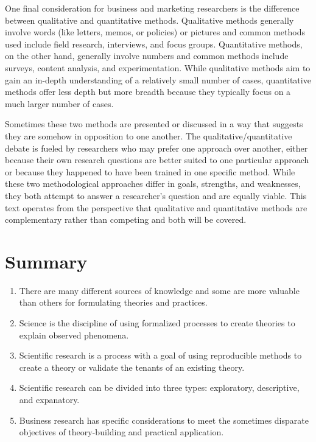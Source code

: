 \documentclass[]{book}
\theoremstyle{definition}
\theoremstyle{definition}
\theoremstyle{definition}
\theoremstyle{remark}
\begin{document}
One final consideration for business and marketing researchers is the
difference between qualitative and quantitative methods. Qualitative
methods generally involve words (like letters, memos, or policies) or
pictures and common methods used include field research, interviews, and
focus groups. Quantitative methods, on the other hand, generally involve
numbers and common methods include surveys, content analysis, and
experimentation. While qualitative methods aim to gain an in-depth
understanding of a relatively small number of cases, quantitative
methods offer less depth but more breadth because they typically focus
on a much larger number of cases.

Sometimes these two methods are presented or discussed in a way that
suggests they are somehow in opposition to one another. The
qualitative/quantitative debate is fueled by researchers who may prefer
one approach over another, either because their own research questions
are better suited to one particular approach or because they happened to
have been trained in one specific method. While these two methodological
approaches differ in goals, strengths, and weaknesses, they both attempt
to answer a researcher's question and are equally viable. This text
operates from the perspective that qualitative and quantitative methods
are complementary rather than competing and both will be covered.

\hypertarget{summary}{%
\section{Summary}\label{summary}}

\begin{enumerate}
\def\labelenumi{\arabic{enumi}.}
\item
  There are many different sources of knowledge and some are more
  valuable than others for formulating theories and practices.
\item
  Science is the discipline of using formalized processes to create
  theories to explain observed phenomena.
\item
  Scientific research is a process with a goal of using reproducible
  methods to create a theory or validate the tenants of an existing
  theory.
\item
  Scientific research can be divided into three types: exploratory,
  descriptive, and expanatory.
\item
  Business research has specific considerations to meet the sometimes
  disparate objectives of theory-building and practical application.
\end{enumerate}
\end{document}
